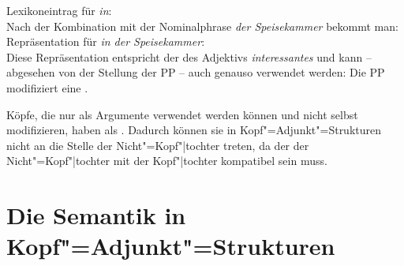 \ea
Lexikoneintrag für \emph{in}:\\
\z
Nach der Kombination mit der Nominalphrase \emph{der Speisekammer} bekommt man:
\ea
Repräsentation für \emph{in der Speisekammer}:\\
\z
Diese Repräsentation entspricht der des Adjektivs \emph{interessantes} und kann 
-- abgesehen von der Stellung der PP -- auch genauso verwendet
werden: Die PP modifiziert eine \nbar.

Köpfe, die nur als Argumente verwendet werden können und nicht selbst modifizieren,
haben als \modw{} . Dadurch können sie in Kopf"=Adjunkt"=Strukturen nicht an die Stelle
der Nicht"=Kopf"|tochter treten, da der \modw der Nicht"=Kopf"|tochter mit der Kopf"|tochter kompatibel
sein muss.





\section{Die Semantik in Kopf"=Adjunkt"=Strukturen}
\label{sem-adj}

